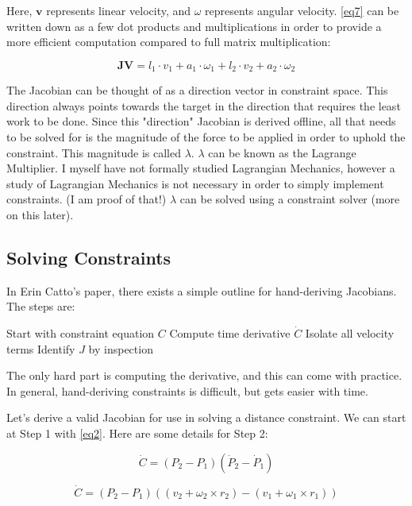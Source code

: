 Here, \(\mathbf{v}\) represents linear velocity, and \(\omega\) represents angular velocity. \eqref{eq7} can be written down as a few dot products and multiplications in order to provide a more efficient computation compared to full matrix multiplication:

\begin{equation}
\mathbf{JV} = l_1 \cdot v_1 + a_1 \cdot \omega_1 + l_2 \cdot v_2 + a_2 \cdot \omega_2
\label{eq8}
\end{equation}

The Jacobian can be thought of as a direction vector in constraint space. This direction always points towards the target in the direction that requires the least work to be done. Since this "direction" Jacobian is derived offline, all that needs to be solved for is the magnitude of the force to be applied in order to uphold the constraint. This magnitude is called \(\lambda\). \(\lambda\) can be known as the Lagrange Multiplier. I myself have not formally studied Lagrangian Mechanics, however a study of Lagrangian Mechanics is not necessary in order to simply implement constraints. (I am proof of that!) \(\lambda\) can be solved using a constraint solver (more on this later).

\subsection{Solving Constraints}
In Erin Catto's paper\cite{catto2009modeling}, there exists a simple outline for hand-deriving Jacobians. The steps are:

    Start with constraint equation \(C\)
    Compute time derivative \(\dot{C}\)
    Isolate all velocity terms
    Identify \(J\) by inspection

The only hard part is computing the derivative, and this can come with practice. In general, hand-deriving constraints is difficult, but gets easier with time.

Let's derive a valid Jacobian for use in solving a distance constraint. We can start at Step 1 with \eqref{eq2}. Here are some details for Step 2:

\begin{equation}
\dot{C} = (P_2 - P_1)(\dot{P}_2 - \dot{P}_1)
\label{eq9}
\end{equation}

\begin{equation}
\dot{C} = (P_2 - P_1)((v_2 + \omega_2 \times r_2) - (v_1 + \omega_1 \times r_1))
\label{eq10}
\end{equation}

